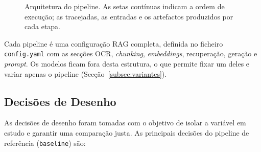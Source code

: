 \documentclass[11pt]{article}
\renewcommand{\_}{\textunderscore\allowbreak}
\begin{document}
\begin{figure}[htbp]
{%
}%
\caption{Arquitetura do pipeline. As setas contínuas indicam a ordem de execução; as tracejadas, as entradas e os artefactos produzidos por cada etapa.}
\label{fig:pipeline}
\end{figure}



Cada pipeline é uma configuração RAG completa, definida no ficheiro \texttt{config.yaml} com as secções OCR, \textit{chunking}, \textit{embeddings}, recuperação, geração e \textit{prompt}. Os modelos ficam fora desta estrutura, o que permite fixar um deles e variar apenas o pipeline (Secção~\ref{subsec:variantes}).

\subsection{Decisões de Desenho}
\label{subsec:decisoes}

As decisões de desenho foram tomadas com o objetivo de isolar a variável em estudo e garantir uma comparação justa. As principais decisões do pipeline de referência (\texttt{baseline}) são:
\end{document}
